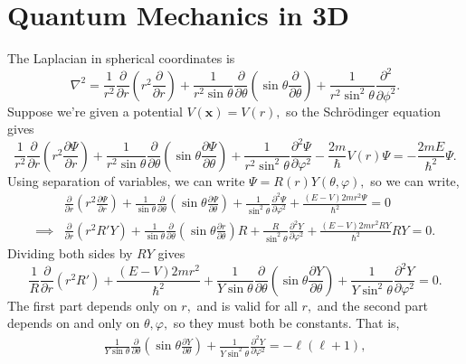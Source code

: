 \documentclass{article}
\numberwithin{equation}{section}
\begin{document}
\section{Quantum Mechanics in 3D}
The Laplacian in spherical coordinates is 
\begin{equation}
    \nabla^2 = \frac{1}{r^2}\frac{\partial}{\partial r}\left(r^2 \frac{\partial}{\partial r}\right) + \frac{1}{r^2\sin\theta}\frac{\partial}{\partial\theta}\left(\sin\theta\frac{\partial}{\partial\theta}\right) + \frac{1}{r^2\sin^2\theta}\frac{\partial^2}{\partial\phi^2}.
\end{equation}
Suppose we're given a potential $V(\bm{x})=V(r),$ so the Schrödinger equation gives 
\begin{equation}
    \frac{1}{r^2}\frac{\partial}{\partial r}\left(r^2\frac{\partial\Psi}{\partial r}\right) + \frac{1}{r^2\sin\theta} \frac{\partial}{\partial \theta}\left(\sin\theta \frac{\partial \Psi}{\partial \theta}\right) + \frac{1}{r^2\sin^2\theta} \frac{\partial^2\Psi}{\partial \varphi^2} - \frac{2m}{\hbar}V(r)\Psi = -\frac{2mE}{\hbar^2}\Psi.
\end{equation}
Using separation of variables, we can write $\Psi = R(r)Y(\theta,\varphi),$ so we can write,
\begin{align}
    &\frac{\partial}{\partial r}\left(r^2 \frac{\partial \Psi}{\partial r}\right) + \frac{1}{\sin\theta}\frac{\partial}{\partial\theta}\left(\sin\theta \frac{\partial\Psi}{\partial \theta}\right) + \frac{1}{\sin^2\theta}\frac{\partial^2\Psi}{\partial\varphi^2} + \frac{(E-V)2mr^2\Psi}{\hbar^2}=0 \\ 
\implies & \frac{\partial}{\partial r}(r^2R'Y) + \frac{1}{\sin\theta}\frac{\partial}{\partial\theta}\left(\sin\theta \frac{\partial r}{\partial\theta}\right)R + \frac{R}{\sin^2\theta}\frac{\partial^2Y}{\partial\varphi^2}+\frac{(E-V)2mr^2RY}{\hbar^2} RY = 0.
\end{align}
Dividing both sides by $RY$ gives 
\begin{equation}
    \frac{1}{R}\frac{\partial}{\partial r}(r^2R') + \frac{(E-V)2mr^2}{\hbar^2} + \frac{1}{Y\sin\theta}\frac{\partial}{\partial\theta}\left(\sin\theta\frac{\partial Y}{\partial\theta}\right) + \frac{1}{Y\sin^2\theta}\frac{\partial^2Y}{\partial\varphi^2}=0.
\end{equation}
The first part depends only on $r,$ and is valid for all $r,$ and the second part depends on and only on $\theta,\varphi,$ so they must both be constants. That is,
\begin{align}
    \frac{1}{Y\sin\theta}\frac{\partial}{\partial\theta}\left(\sin\theta \frac{\partial Y}{\partial \theta}\right) + \frac{1}{Y\sin^2\theta}\frac{\partial^2 Y}{\partial\varphi^2} = -\ell(\ell + 1), 
\end{align}
\end{document}
